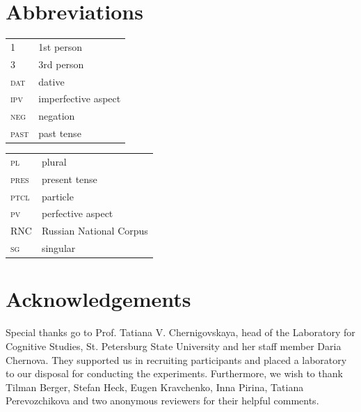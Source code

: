 \documentclass[output=paper,colorlinks,citecolor=brown,newtxmath,hidelinks]{langscibook}
\begin{document}
\section*{Abbreviations}

\begin{tabularx}{.5\textwidth}{@{}lQ@{}}
\textsc{1}&1st person\\
\textsc{3}&3rd person\\
\textsc{dat}&{dative}\\
\textsc{ipv}&{imperfective aspect}\\
\textsc{neg}&{negation}\\
\textsc{past}&{past tense}\\
\end{tabularx}%
\begin{tabularx}{.5\textwidth}{@{}lQ@{}}
\textsc{pl}&{plural}\\
\textsc{pres}&{present tense}\\
\textsc{ptcl}&particle\\
\textsc{pv}&{perfective aspect}\\
\textsc{RNC}&{Russian} National Corpus\\
\textsc{sg}&singular\\
\end{tabularx}

\section*{Acknowledgements}
Special thanks go to Prof. Tatiana V. Chernigovskaya, head of the Laboratory for Cognitive Studies, St. Petersburg State University and her staff member Daria Chernova. They supported us in recruiting participants and placed a laboratory to our disposal for conducting the experiments. Furthermore, we wish to thank Tilman Berger, Stefan Heck, Eugen Kravchenko, Inna Pirina, Tatiana Pere\-voz\-chi\-kova and two anonymous reviewers for their helpful comments.


\end{document}
